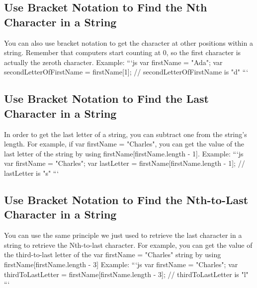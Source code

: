 \documentclass{article}%
\begin{document}
%
\subsection{Use Bracket Notation to Find the Nth Character in a String}%
\label{subsec:UseBracketNotationtoFindtheNthCharacterinaString}%
You can also use bracket notation to get the character at other positions within a string.\newline%
Remember that computers start counting at 0, so the first character is actually the zeroth character.\newline%
Example:\newline%
```js\newline%
var firstName = "Ada";\newline%
var secondLetterOfFirstName = firstName{[}1{]}; // secondLetterOfFirstName is "d"\newline%
```\newline%

%
\subsection{Use Bracket Notation to Find the Last Character in a String}%
\label{subsec:UseBracketNotationtoFindtheLastCharacterinaString}%
In order to get the last letter of a string, you can subtract one from the string's length.\newline%
For example, if var firstName = "Charles", you can get the value of the last letter of the string by using firstName{[}firstName.length {-} 1{]}.\newline%
Example:\newline%
```js\newline%
var firstName = "Charles";\newline%
var lastLetter = firstName{[}firstName.length {-} 1{]}; // lastLetter is "s"\newline%
```\newline%

%
\subsection{Use Bracket Notation to Find the Nth{-}to{-}Last Character in a String}%
\label{subsec:UseBracketNotationtoFindtheNth{-}to{-}LastCharacterinaString}%
You can use the same principle we just used to retrieve the last character in a string to retrieve the Nth{-}to{-}last character.\newline%
For example, you can get the value of the third{-}to{-}last letter of the var firstName = "Charles" string by using firstName{[}firstName.length {-} 3{]}\newline%
Example:\newline%
```js\newline%
var firstName = "Charles";\newline%
var thirdToLastLetter = firstName{[}firstName.length {-} 3{]}; // thirdToLastLetter is "l"\newline%
```\newline%
\end{document}
